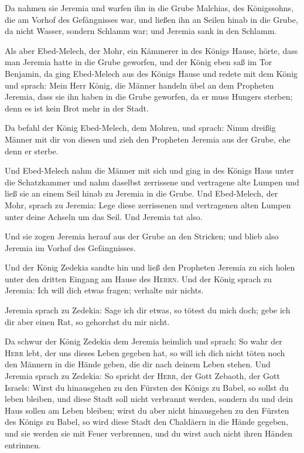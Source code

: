  Da nahmen sie Jeremia und warfen ihn in die Grube
Malchias, des Königssohns, die am Vorhof des Gefängnisses war, und
ließen ihn an Seilen hinab in die Grube, da nicht Wasser, sondern
Schlamm war; und Jeremia sank in den Schlamm.

 Als aber Ebed-Melech, der Mohr, ein Kämmerer in des
Königs Hause, hörte, dass man Jeremia hatte in die Grube geworfen, und
der König eben saß im Tor Benjamin,  da ging Ebed-Melech
aus des Königs Hause und redete mit dem König und sprach: 
Mein Herr König, die Männer handeln übel an dem Propheten Jeremia, dass
sie ihn haben in die Grube geworfen, da er muss Hungers sterben; denn es
ist kein Brot mehr in der Stadt.

 Da befahl der König Ebed-Melech, dem Mohren, und sprach:
Nimm dreißig Männer mit dir von diesen und zieh den Propheten Jeremia
aus der Grube, ehe denn er sterbe.

 Und Ebed-Melech nahm die Männer mit sich und ging in des
Königs Haus unter die Schatzkammer und nahm daselbst zerrissene und
vertragene alte Lumpen und ließ sie an einem Seil hinab zu Jeremia in
die Grube.  Und Ebed-Melech, der Mohr, sprach zu Jeremia:
Lege diese zerrissenen und vertragenen alten Lumpen unter deine Achseln
um das Seil. Und Jeremia tat also.

 Und sie zogen Jeremia herauf aus der Grube an den
Stricken; und blieb also Jeremia im Vorhof des Gefängnisses.

 Und der König Zedekia sandte hin und ließ den Propheten
Jeremia zu sich holen unter den dritten Eingang am Hause des
\textsc{Herrn}. Und der König sprach zu Jeremia: Ich will dich etwas
fragen; verhalte mir nichts.

 Jeremia sprach zu Zedekia: Sage ich dir etwas, so tötest
du mich doch; gebe ich dir aber einen Rat, so gehorchst du mir nicht.

 Da schwur der König Zedekia dem Jeremia heimlich und
sprach: So wahr der \textsc{Herr} lebt, der uns dieses Leben gegeben
hat, so will ich dich nicht töten noch den Männern in die Hände geben,
die dir nach deinem Leben stehen.  Und Jeremia sprach zu
Zedekia: So spricht der \textsc{Herr}, der Gott Zebaoth, der Gott
Israels: Wirst du hinausgehen zu den Fürsten des Königs zu Babel, so
sollst du leben bleiben, und diese Stadt soll nicht verbrannt werden,
sondern du und dein Haus sollen am Leben bleiben;  wirst
du aber nicht hinausgehen zu den Fürsten des Königs zu Babel, so wird
diese Stadt den Chaldäern in die Hände gegeben, und sie werden sie mit
Feuer verbrennen, und du wirst auch nicht ihren Händen entrinnen.

